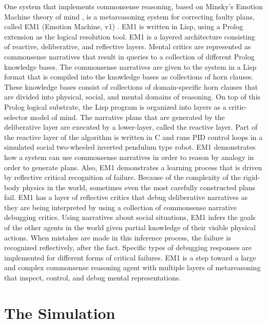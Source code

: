 One system that implements commonsense reasoning, based on Minsky's
Emotion Machine theory of mind \cite[]{minsky:2006}, is a
metareasoning system for correcting faulty plans, called EM1 (Emotion
Machine, v1) \cite[]{singh:2005b}. EM1 is written in Lisp, using a
Prolog extension as the logical resolution tool. EM1 is a layered
architecture consisting of reactive, deliberative, and reflective
layers. Mental critics are represented as commonsense narratives that
result in queries to a collection of different Prolog knowledge
bases. The commonsense narratives are given to the system in a Lisp
format that is compiled into the knowledge bases as collections of
horn clauses. These knowledge bases consist of collections of
domain-specific horn clauses that are divided into physical, social,
and mental domains of reasoning. On top of this Prolog logical
substrate, the Lisp program is organized into layers as a
critic-selector model of mind. The narrative plans that are generated
by the deliberative layer are executed by a lower-layer, called the
reactive layer. Part of the reactive layer of the algorithm is written
in C and runs PID control loops in a simulated social two-wheeled
inverted pendulum type robot. EM1 demonstrates how a system can use
commonsense narratives in order to reason by analogy in order to
generate plans. Also, EM1 demonstrates a learning process that is
driven by reflective critical recognition of failure. Because of the
complexity of the rigid-body physics in the world, sometimes even the
most carefully constructed plans fail. EM1 has a layer of reflective
critics that debug deliberative narratives as they are being
interpreted by using a collection of commonsense narrative debugging
critics.  Using narratives about social situations, EM1 infers the
goals of the other agents in the world given partial knowledge of
their visible physical actions. When mistakes are made in this
inference process, the failure is recognized reflectively, after the
fact. Specific types of debugging responses are implemented for
different forms of critical failures. EM1 is a step toward a large and
complex commonsense reasoning agent with multiple layers of
metareasoning that inspect, control, and debug mental representations.

\section{The Simulation}

